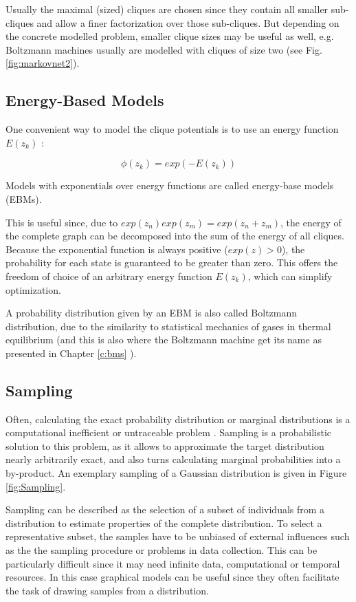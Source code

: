 Usually the maximal (sized) cliques are chosen since they contain all smaller sub-cliques and allow a finer factorization over those sub-cliques.
But depending on the concrete modelled problem, smaller clique sizes may be useful as well, e.g. Boltzmann machines usually are modelled with cliques of size two (see Fig. \ref{fig:markovnet2}).




\subsection{Energy-Based Models} \label{c:ebms}

One convenient way to model the clique potentials is to use an energy function $E(z_k)$ \cite{Goodfellow-et-al-2016-Book}: 

\[
\phi(z_k) = exp(- E(z_k))
\]

Models with exponentials over energy functions are called energy-base models (EBMs).

This is useful since, due to $exp(z_n)exp(z_m) = exp(z_n+z_m)$, the energy of the complete graph can be decomposed into the sum of the energy of all cliques.
Because the exponential function is always positive ($exp(z) > 0$), the probability for each state is guaranteed to be greater than zero. 
This offers the freedom of choice of an arbitrary energy function $E(z_k)$, which can simplify optimization. 

A probability distribution given by an EBM is also called Boltzmann distribution, due to the similarity to statistical mechanics of gases in thermal equilibrium (and this is also where the Boltzmann machine get its name as presented in Chapter \ref{c:bms} ).

\subsection{Sampling} \label{c:sampling}

Often, calculating the exact probability distribution or marginal distributions is a computational inefficient or untraceable problem \cite{Goodfellow-et-al-2016-Book} \cite{Petrovici2016}.
Sampling is a probabilistic solution to this problem, as it allows to approximate the target distribution nearly arbitrarily exact, and also turns calculating marginal probabilities into a by-product.  
An exemplary sampling of a Gaussian distribution is given in Figure \ref{fig:Sampling}.

Sampling can be described as the selection of a subset of individuals from a distribution to estimate properties of the complete distribution.
To select a representative subset, the samples have to be unbiased of external influences such as the the sampling procedure or problems in data collection.
This can be particularly difficult since it may need infinite data, computational or temporal resources.
In this case graphical models can be useful since they often facilitate the task of drawing samples from a distribution.

